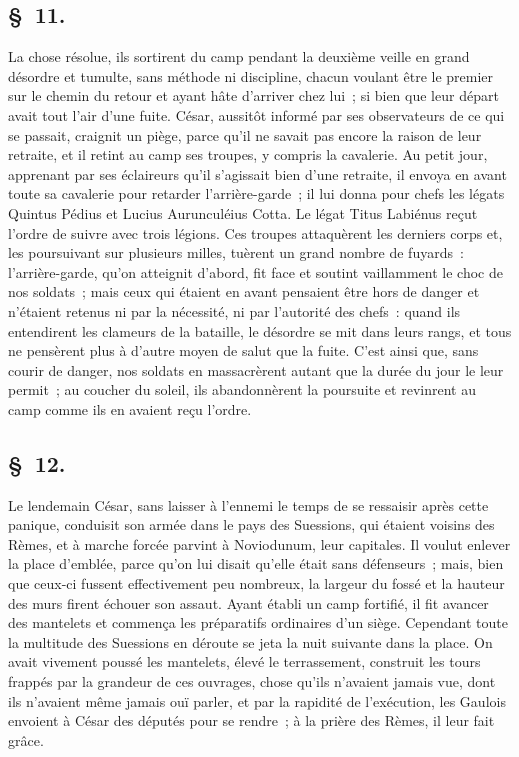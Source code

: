 \documentclass[french,twoside]{book} %
\begin{document}
\subsection[{§ 11.}]{ \textsc{§ 11.} }
\noindent La chose résolue, ils sortirent du camp pendant la deuxième veille en grand désordre et tumulte, sans méthode ni discipline, chacun voulant être le premier sur le chemin du retour et ayant hâte d’arriver chez lui ; si bien que leur départ avait tout l’air d’une fuite. César, aussitôt informé par ses observateurs de ce qui se passait, craignit un piège, parce qu’il ne savait pas encore la raison de leur retraite, et il retint au camp ses troupes, y compris la cavalerie. Au petit jour, apprenant par ses éclaireurs qu’il s’agissait bien d’une retraite, il envoya en avant toute sa cavalerie pour retarder l’arrière-garde ; il lui donna pour chefs les légats Quintus Pédius et Lucius Aurunculéius Cotta. Le légat Titus Labiénus reçut l’ordre de suivre avec trois légions. Ces troupes attaquèrent les derniers corps et, les poursuivant sur plusieurs milles, tuèrent un grand nombre de fuyards : l’arrière-garde, qu’on atteignit d’abord, fit face et soutint vaillamment le choc de nos soldats ; mais ceux qui étaient en avant pensaient être hors de danger et n’étaient retenus ni par la nécessité, ni par l’autorité des chefs : quand ils entendirent les clameurs de la bataille, le désordre se mit dans leurs rangs, et tous ne pensèrent plus à d’autre moyen de salut que la fuite. C'est ainsi que, sans courir de danger, nos soldats en massacrèrent autant que la durée du jour le leur permit ; au coucher du soleil, ils abandonnèrent la poursuite et revinrent au camp comme ils en avaient reçu l’ordre.
\subsection[{§ 12.}]{ \textsc{§ 12.} }
\noindent Le lendemain César, sans laisser à l’ennemi le temps de se ressaisir après cette panique, conduisit son armée dans le pays des Suessions, qui étaient voisins des Rèmes, et à marche forcée parvint à Noviodunum, leur capitales. Il voulut enlever la place d’emblée, parce qu’on lui disait qu’elle était sans défenseurs ; mais, bien que ceux-ci fussent effectivement peu nombreux, la largeur du fossé et la hauteur des murs firent échouer son assaut. Ayant établi un camp fortifié, il fit avancer des mantelets et commença les préparatifs ordinaires d’un siège. Cependant toute la multitude des Suessions en déroute se jeta la nuit suivante dans la place. On avait vivement poussé les mantelets, élevé le terrassement, construit les tours frappés par la grandeur de ces ouvrages, chose qu’ils n’avaient jamais vue, dont ils n’avaient même jamais ouï parler, et par la rapidité de l’exécution, les Gaulois envoient à César des députés pour se rendre ; à la prière des Rèmes, il leur fait grâce.
\end{document}
